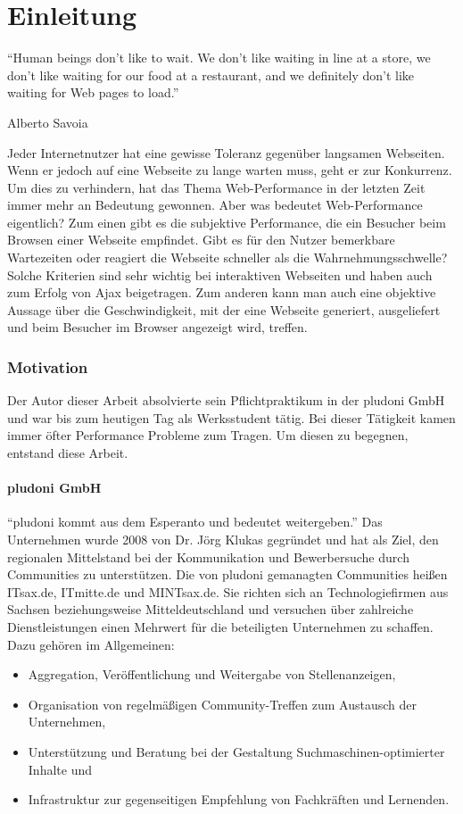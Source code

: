 \part{Einleitung}
\epigraph{``Human beings don’t like to wait. We don’t like waiting in line at a store, we don’t like waiting for our food at a restaurant, and we definitely don’t like waiting for Web pages to load.''}{Alberto Savoia}

Jeder Internetnutzer hat eine gewisse Toleranz gegenüber langsamen Webseiten. Wenn er jedoch auf eine Webseite zu lange warten muss, geht er zur Konkurrenz.\citep{websiteoptimization2008} Um dies zu verhindern, hat das Thema Web-Performance in der letzten Zeit immer mehr an Bedeutung gewonnen. Aber was bedeutet Web-Performance eigentlich? Zum einen gibt es die subjektive Performance, die ein Besucher beim Browsen einer Webseite empfindet. Gibt es für den Nutzer bemerkbare Wartezeiten oder reagiert die Webseite schneller als die Wahrnehmungsschwelle? Solche Kriterien sind sehr wichtig bei interaktiven Webseiten und haben auch zum Erfolg von Ajax beigetragen. Zum anderen kann man auch eine objektive Aussage über die Geschwindigkeit, mit der eine Webseite generiert, ausgeliefert und beim Besucher im Browser angezeigt wird, treffen. 
\label{sec:intro}
\section{Motivation}
Der Autor dieser Arbeit absolvierte sein Pflichtpraktikum in der pludoni GmbH und war bis zum heutigen Tag als Werksstudent tätig. Bei dieser T\"atigkeit kamen immer \"ofter Performance Probleme zum Tragen. Um diesen zu begegnen, entstand diese Arbeit.
\subsection{pludoni GmbH}
“pludoni kommt aus dem Esperanto und bedeutet weitergeben.” \citep{Klukas2011}
Das Unternehmen wurde 2008 von Dr. Jörg Klukas gegründet und hat als Ziel, den regionalen Mittelstand bei der Kommunikation und Bewerbersuche durch Communities zu unterstützen. Die von pludoni gemanagten Communities heißen ITsax.de, ITmitte.de und MINTsax.de. Sie richten sich an Technologiefirmen aus Sachsen beziehungsweise Mitteldeutschland und versuchen über zahlreiche Dienstleistungen einen Mehrwert für die beteiligten Unternehmen zu schaffen. Dazu geh\"oren im Allgemeinen:

\begin{itemize}
 \item Aggregation, Veröffentlichung und Weitergabe von Stellenanzeigen,
 \item Organisation von regelmäßigen Community-Treffen zum Austausch der Unternehmen,
 \item Unterstützung und Beratung bei der Gestaltung Suchmaschinen-optimierter Inhalte und
 \item Infrastruktur zur gegenseitigen Empfehlung von Fachkräften und Lernenden.
\end{itemize}


